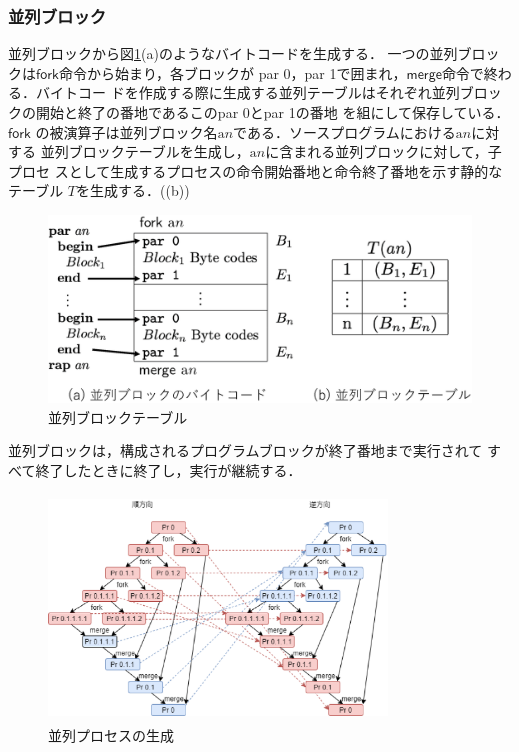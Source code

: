 \documentclass[submit,PRO]{ipsj}
\newcommand{\bcode}[1]{$\mathsf{#1}$}
\newcommand{\alabel}[1]{\mathrm{a}#1}
\begin{document}
\subsubsection{並列ブロック}

並列ブロックから図\ref{fig:parallelTable}(a)のようなバイトコードを生成する．
%
一つの並列ブロックは\bcode{fork}命令から始まり，各ブロックが
{\sf par 0}，{\sf par 1}で囲まれ，\bcode{merge}命令で終わる．バイトコー
ドを作成する際に生成する並列テーブルはそれぞれ並列ブロックの開始と終了の番地であるこの{\sf par 0}と{\sf par 1}の番地
を組にして保存している．\bcode{fork}
の被演算子は並列ブロック名$\alabel{n}$である．ソースプログラムにおける$\alabel{n}$に対する
並列ブロックテーブルを生成し，$\alabel{n}$に含まれる並列ブロックに対して，子プロセ
スとして生成するプロセスの命令開始番地と命令終了番地を示す静的なテーブル
$T$を生成する．((b))

\begin{figure}[tb]
\includegraphics[width=.8\linewidth]{./parallelTable_1-r1.eps}
\caption{並列ブロックテーブル}
\label{fig:parallelTable}
\end{figure}

並列ブロックは，構成されるプログラムブロックが終了番地まで実行されて
すべて終了したときに終了し，実行が継続する．

\begin{figure}[tb]
\includegraphics[height=6.0cm,width=9.0cm]{./parallel.eps}
\caption{並列プロセスの生成}
\label{fig:parallel}
\end{figure}
\end{document}
